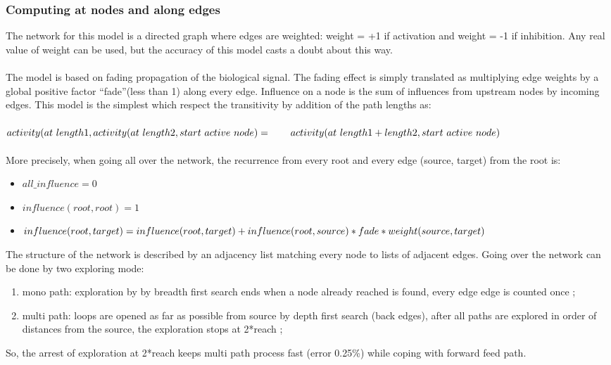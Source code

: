 \subsubsection{Computing at nodes and along edges}
The network for this model is a directed graph where edges are weighted: weight = +1 if activation and weight = -1 if inhibition. Any real value of weight can be used, but the accuracy of this model casts a doubt about this way.\\\\
The model is based on fading propagation of the biological signal. The fading effect  is simply translated as multiplying edge weights  by a global positive factor \textquotedblleft fade\textquotedblright (less than 1) along every edge. Influence on a node is the sum of influences from upstream nodes by incoming edges. This model is the simplest which respect the transitivity by addition of the path lengths as:\\\\
$activity(at\ length1,activity(at\ length2,start\ active\ node)=\\\hspace*{2em}activity(at\ length1+length2, start\ active\ node)$\\\\
More precisely, when going all over the network, the recurrence from every root and every edge (source, target) from the root is:
\begin{itemize}
\item $all\_influence = 0$
\item $influence (root, root) = 1$
\item $influence (root, target)= influence (root, target) +\\influence (root, source) * fade * weight (source, target)$
\end{itemize}
The structure of the network is described by an adjacency list matching every node to lists of adjacent edges. Going over the network can be done by two exploring mode:
\begin{enumerate}
\item mono path: exploration by by breadth first search ends when a node already reached is found, every edge edge is counted once ; 
\item multi path: loops are opened as far as possible from source by depth first search (back edges), after all paths are explored in order of distances from the source, the exploration stops at 2*reach  ;
\end{enumerate}
So,  the arrest of exploration at 2*reach keeps multi path process fast (error 0.25\%) while coping with forward feed path.
